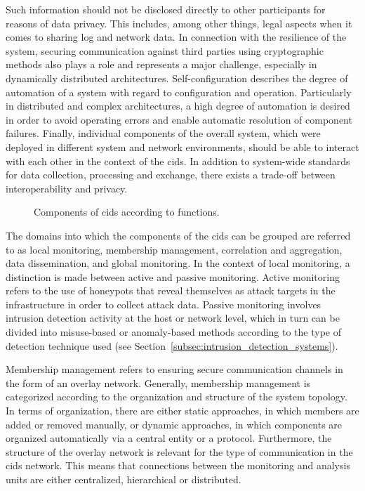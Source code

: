 Such information should not be disclosed directly to other participants for reasons of data privacy. This includes, among other things, legal aspects when it comes to sharing log and network data. In connection with the resilience of the system, securing communication against third parties using cryptographic methods also plays a role and represents a major challenge, especially in dynamically distributed architectures. Self-configuration describes the degree of automation of a system with regard to configuration and operation. Particularly in distributed and complex architectures, a high degree of automation is desired in order to avoid operating errors and enable automatic resolution of component failures. Finally, individual components of the overall system, which were deployed in different system and network environments, should be able to interact with each other in the context of the \gls{cids}. In addition to system-wide standards for data collection, processing and exchange, there exists a trade-off between interoperability and privacy.

\begin{figure}[t]
    \centering
    
    \caption[\gls{cids} components]{Components of \gls{cids} according to functions.}
    \label{fig:cids_components}
\end{figure}

The domains into which the components of the \gls{cids} can be grouped are referred to as local monitoring, membership management, correlation and aggregation, data dissemination, and global monitoring. In the context of local monitoring, a distinction is made between active and passive monitoring. Active monitoring refers to the use of honeypots that reveal themselves as attack targets in the infrastructure in order to collect attack data. Passive monitoring involves intrusion detection activity at the host or network level, which in turn can be divided into misuse-based or anomaly-based methods according to the type of detection technique used (see Section~\ref{subsec:intrusion_detection_systems}). 

Membership management refers to ensuring secure communication channels in the form of an overlay network. Generally, membership management is categorized according to the organization and structure of the system topology. In terms of organization, there are either static approaches, in which members are added or removed manually, or dynamic approaches, in which components are organized automatically via a central entity or a protocol. Furthermore, the structure of the overlay network is relevant for the type of communication in the \gls{cids} network. This means that connections between the monitoring and analysis units are either centralized, hierarchical or distributed. 

